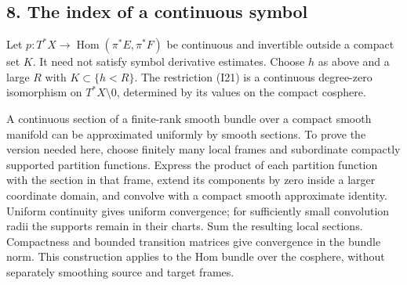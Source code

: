 \documentclass[
  11pt,
]{article}
\makeatletter
\let\ReaderOriginalAnchorStart\hyper@anchorstart
\let\ReaderOriginalAnchorEnd\hyper@anchorend
\let\ReaderPendingAliases\@empty
\def\ReaderArmAliases#1{\gdef\ReaderPendingAliases{#1}}
\def\hyper@anchorstart#1{\ReaderIfNativeAnchorTF{#1}{\ReaderPendingAliases\global\let\ReaderPendingAliases\@empty}{}\ReaderOriginalAnchorStart{#1}}
\makeatother
\begin{document}
\ReaderArmAliases{\ReaderOriginalAnchorStart{AN03-GSI-008}\ReaderOriginalAnchorEnd\begingroup\expandafter\def\csname @currentHref\endcsname{AN03-GSI-008}\label{AN03-GSI-008}\endgroup\ReaderOriginalAnchorStart{an03-gsi-008-the-index-of-a-continuous-symbol}\ReaderOriginalAnchorEnd\begingroup\expandafter\def\csname @currentHref\endcsname{an03-gsi-008-the-index-of-a-continuous-symbol}\label{an03-gsi-008-the-index-of-a-continuous-symbol}\endgroup\ReaderOriginalAnchorStart{8-the-index-of-a-continuous-symbol}\ReaderOriginalAnchorEnd\begingroup\expandafter\def\csname @currentHref\endcsname{8-the-index-of-a-continuous-symbol}\label{8-the-index-of-a-continuous-symbol}\endgroup}
\subsection{8. The index of a continuous
symbol}\label{the-index-of-a-continuous-symbol}

Let \(p:T^*X\to\operatorname{Hom}(\pi^*E,\pi^*F)\) be continuous and
invertible outside a compact set \(K\). It need not satisfy symbol
derivative estimates. Choose \(h\) as above and a large \(R\) with
\(K\subset\{h<R\}\). The restriction (I21) is a continuous degree-zero
isomorphism on \(T^*X\setminus0\), determined by its values on the
compact cosphere.

A continuous section of a finite-rank smooth bundle over a compact
smooth manifold can be approximated uniformly by smooth sections. To
prove the version needed here, choose finitely many local frames and
subordinate compactly supported partition functions. Express the product
of each partition function with the section in that frame, extend its
components by zero inside a larger coordinate domain, and convolve with
a compact smooth approximate identity. Uniform continuity gives uniform
convergence; for sufficiently small convolution radii the supports
remain in their charts. Sum the resulting local sections. Compactness
and bounded transition matrices give convergence in the bundle norm.
This construction applies to the Hom bundle over the cosphere, without
separately smoothing source and target frames.
\end{document}
